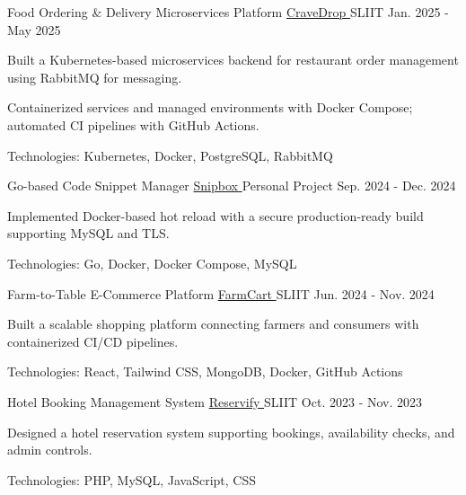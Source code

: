 
\begin{cventries}

  \cventry
    {Food Ordering & Delivery Microservices Platform}
    {\href{https://github.com/nmdra/CraveDrop}{CraveDrop \faGithub}}
    {SLIIT}
    {Jan. 2025 - May 2025}
    {
      \begin{cvitems}
        \item {Built a Kubernetes-based microservices backend for restaurant order management using RabbitMQ for messaging.}
        \item {Containerized services and managed environments with Docker Compose; automated CI pipelines with GitHub Actions.}
        \item {Technologies: Kubernetes, Docker, PostgreSQL, RabbitMQ}
      \end{cvitems}
    }

  \cventry
    {Go-based Code Snippet Manager}
    {\href{https://github.com/nmdra/snipbox}{Snipbox \faGithub}}
    {Personal Project}
    {Sep. 2024 - Dec. 2024}
    {
      \begin{cvitems}
        \item {Implemented Docker-based hot reload with a secure production-ready build supporting MySQL and TLS.}
        \item {Technologies: Go, Docker, Docker Compose, MySQL}
      \end{cvitems}
    }

  \cventry
    {Farm-to-Table E-Commerce Platform}
    {\href{https://github.com/nmdra/FarmCart}{FarmCart \faGithub}}
    {SLIIT}
    {Jun. 2024 - Nov. 2024}
    {
      \begin{cvitems}
        \item {Built a scalable shopping platform connecting farmers and consumers with containerized CI/CD pipelines.}
        \item {Technologies: React, Tailwind CSS, MongoDB, Docker, GitHub Actions}
      \end{cvitems}
    }

  \cventry
    {Hotel Booking Management System}
    {\href{https://github.com/nmdra/Reservify}{Reservify \faGithub}}
    {SLIIT}
    {Oct. 2023 - Nov. 2023}
    {
      \begin{cvitems}
        \item {Designed a hotel reservation system supporting bookings, availability checks, and admin controls.}
        \item {Technologies: PHP, MySQL, JavaScript, CSS}
      \end{cvitems}
    }


\end{cventries}
